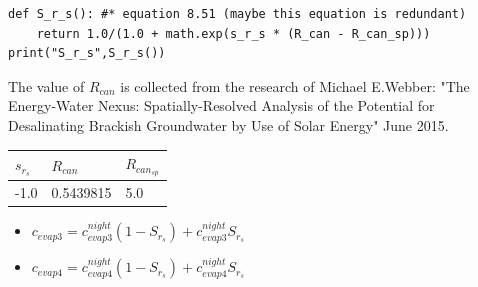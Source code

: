 \documentclass[a4paper]{article}
\numberwithin{equation}{section}
\begin{document}
\begin{mdframed}[leftline=false,rightline=false,backgroundcolor=cyan!10]
  \begin{verbatim}
def S_r_s(): #* equation 8.51 (maybe this equation is redundant)
    return 1.0/(1.0 + math.exp(s_r_s * (R_can - R_can_sp)))
print("S_r_s",S_r_s())
\end{verbatim}
\end{mdframed}

The value of $R_{can}$ is collected from the research of Michael E.Webber: "The Energy-Water Nexus: Spatially-Resolved Analysis of the Potential for Desalinating Brackish Groundwater by Use of Solar Energy" June 2015.

\begin{table}[H]
\centering
\begin{tabular}{|l|l|l|}
\hline
\rowcolor[HTML]{FFFC9E} 
\textbf{$s_{r_s}$} & \textbf{$R_{can}$} & \cellcolor[HTML]{FFFC9E}\textbf{$R_{can_{sp}}$} \\ \hline
-1.0           & 0.5439815        & 5.0                    \\ \hline
\end{tabular}
\end{table}
\begin{itemize}
    \item $c_{evap3} = c_{evap3}^{night} (1 - S_{r_s}) + c_{evap3}^{night} S_{r_s} $\\
    \item $c_{evap4} = c_{evap4}^{night} (1 - S_{r_s}) + c_{evap4}^{night} S_{r_s}$
\end{itemize}
\end{document}
